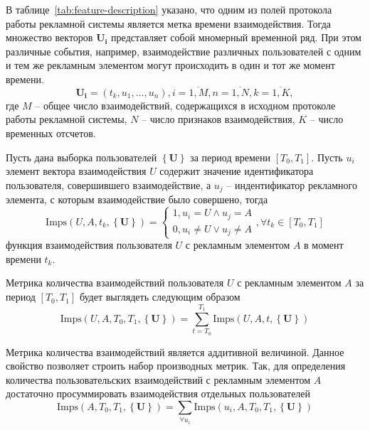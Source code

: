 В таблице~\ref{tab:feature-description} указано, что одним из полей протокола работы рекламной системы является метка
времени взаимодействия. Тогда множество векторов $\mathbf{U_i}$ представляет собой мномерный временной ряд. При этом 
различные события, например, взаимодействие различных пользователей с одним и тем же рекламным элементом могут
происходить в один и тот же момент времени.
\begin{equation}
    \mathbf{U_i} = \left(t_k, u_1, \dots, u_n \right), i = \overline{1, M}, n = \overline{1, N}, k = \overline{1, K},
\end{equation}
где $M$ -- общее число взаимодействий, содержащихся в исходном протоколе работы рекламной системы, $N$ -- число признаков
взаимодействия, $K$ -- число временных отсчетов.

Пусть дана выборка пользователей $\left\{ \mathbf{U} \right\}$ за период времени $\left[T_0, T_1\right]$. Пусть $u_i$
элемент вектора взаимодействия $U$ содержит значение идентификатора пользователя, совершившего взаимодействие, а $u_j$ -- 
индентификатор рекламного элемента, с которым взаимодействие было совершено, тогда
\begin{equation}
    \text{Imps} \left( U, A, t_k, \left\{ \mathbf{U} \right\} \right) =
        \begin{cases}
            1, u_i = U \wedge u_j = A  \\
            0, u_i \neq U \vee u_j \neq A
        \end{cases}, \forall t_k \in \left[T_0, T_1\right]
\end{equation}
функция взаимодействия пользователя $U$ с рекламным элементом $A$ в момент времени $t_k$. 

Метрика количества взаимодействий пользователя $U$ с рекламным элементом $A$ за период $\left[T_0, T_1\right]$ 
будет выглядеть следующим образом
\begin{equation}
    \text{Imps} \left( U, A, T_0, T_1, \left\{ \mathbf{U} \right\} \right) =
    \sum \limits_{t=T_0}^{T_1} \text{Imps} \left( U, A, t, \left\{ \mathbf{U} \right\} \right) 
\end{equation}

Метрика количества взаимодействий является аддитивной величиной. Данное свойство позволяет строить набор производных
метрик. Так, для определения количества пользовательских взаимодействий с рекламным элементом $A$ достаточно просуммировать 
взаимодействия отдельных пользователей
\begin{equation}
    \text{Imps} \left(A, T_0, T_1, \left\{ \mathbf{U} \right\} \right) =
    \sum \limits_{\forall u_i} \text{Imps} \left( u_i, A, T_0, T_1, \left\{ \mathbf{U} \right\} \right)
\end{equation}

